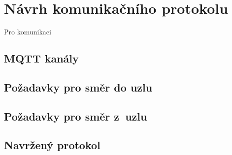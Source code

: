 \chapter{Návrh komunikačního protokolu}
\label{ch:protokol}

Pro komunikaci

\section{MQTT kanály}

\section{Požadavky pro směr do uzlu}

\section{Požadavky pro směr z~uzlu}

\section{Navržený protokol}

